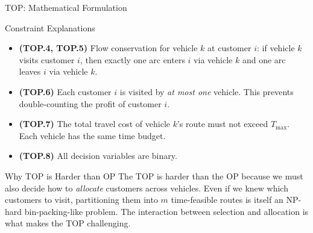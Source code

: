 \documentclass[aspectratio=169,10pt]{beamer}
\begin{document}
\begin{frame}[allowframebreaks]{TOP: Mathematical Formulation}
\begin{block}{Constraint Explanations}
\begin{itemize}
      \item \textbf{(TOP.4, TOP.5)} Flow conservation for vehicle $k$ at
            customer $i$: if vehicle $k$ visits customer $i$, then exactly
            one arc enters $i$ via vehicle $k$ and one arc leaves $i$ via
            vehicle $k$.

      \item \textbf{(TOP.6)} Each customer $i$ is visited by \emph{at most
            one} vehicle.
            This prevents double-counting the profit of customer $i$.

      \item \textbf{(TOP.7)} The total travel cost of vehicle $k$'s route
            must not exceed $T_{\max}$.
            Each vehicle has the same time budget.

      \item \textbf{(TOP.8)} All decision variables are binary.
    \end{itemize}
  \end{block}

  \begin{alertblock}{Why TOP is Harder than OP}
    The TOP is harder than the OP because we must also decide how to
    \emph{allocate} customers across vehicles.
    Even if we knew which customers to visit, partitioning them into
    $m$ time-feasible routes is itself an NP-hard bin-packing-like problem.
    The interaction between selection and allocation is what makes the TOP
    challenging.
  \end{alertblock}

\end{frame}
\end{document}
